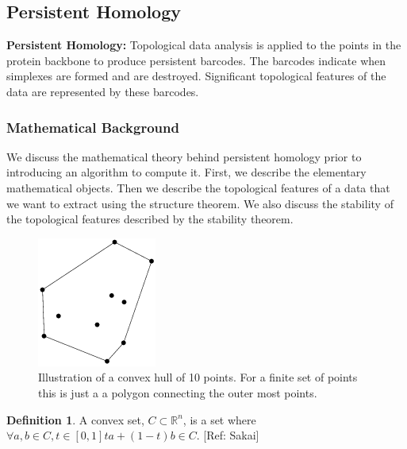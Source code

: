 \documentclass[12pt, a4paper, twocolumn, fullpage]{article}
\theoremstyle{plain}
\theoremstyle{definition}
\newtheorem{defn}{Definition}[section]
\theoremstyle{remark}
\begin{document}
\subsection{ Persistent Homology}
\textbf{Persistent Homology: } Topological data analysis is applied to the points in the protein backbone to produce persistent barcodes. The barcodes indicate when simplexes are formed and are destroyed. Significant topological features of the data are represented by these barcodes.


\subsubsection{ Mathematical Background}

We discuss the mathematical theory behind persistent homology prior to introducing an algorithm to compute it.  First, we describe the elementary mathematical objects. Then we describe the topological features of a data that we want to extract using the structure theorem. We also discuss the stability of the topological features described by the stability theorem.

\begin{figure}[t]
\centering
    \includegraphics[width=.6\linewidth]{img/mathDef/ConvexHull2D}
    \caption{Illustration of a convex hull of 10 points. For a finite set of points this is just a a polygon connecting the outer most points.}
    \label{ConvexHull}
\end{figure}

\begin{defn}
A convex set, $C \subset \mathbb{R}^n$, is a set where $\forall a,b \in C, t \in [0,1] ta+(1-t)b \in C$. [Ref: Sakai]
\end{defn}
\end{document}
